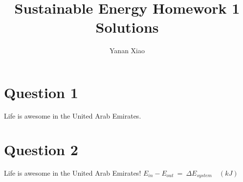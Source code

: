 \documentclass[12pt]{article}
\begin{document}
\title{Sustainable Energy Homework 1 Solutions}
\author{Yanan Xiao}
\maketitle{}

\section{Question 1}
\label{sec:question-1}

Life is awesome in the United Arab Emirates.

\section{Question 2}
\label{sec:question-2}

Life is awesome in the United Arab Emirates!
$E_{in}-E_{out}~=~\Delta E_{system}\quad (kJ)$
\end{document}
